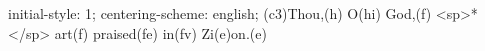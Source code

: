 initial-style: 1;
centering-scheme: english;
(c3)Thou,(h) O(hi) God,(f) <sp>*</sp> art(f) praised(fe) in(fv) Zi(e)on.(e)
